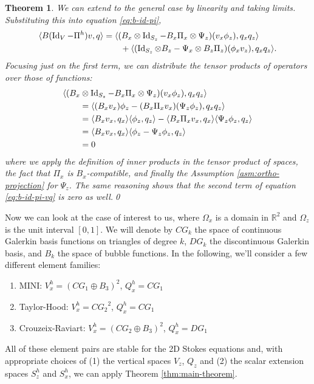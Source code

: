\documentclass{article}
\theoremstyle{definition}
\theoremstyle{plain}
\newtheorem{thm}{Theorem}
\newcommand{\Id}[1]{\operatorname{Id} #1}
\begin{document}
\begin{thm}
    We can extend to the general case by linearity and taking limits.
    Substituting this into equation \eqref{eq:b-id-pi},
    \begin{align}
        \langle B(\Id_V - \Pi^h)v, q\rangle & = \langle(B_x\otimes\Id_{S_z} - B_x\Pi_x\otimes \Psi_z)(v_x\phi_z), q_x q_z\rangle \nonumber \\
        & \qquad + \langle(\Id_{S_z}\otimes B_z - \Psi_x\otimes B_z\Pi_z)(\phi_xv_z), q_xq_z\rangle.
        \label{eq:b-id-pi-vq}
    \end{align}
    Focusing just on the first term, we can distribute the tensor products of operators over those of functions:
    \begin{align}
        & \langle(B_x\otimes\Id_{S_z} - B_x\Pi_x\otimes \Psi_z)(v_x\phi_z), q_x q_z\rangle \nonumber\\
        &\qquad = \langle (B_xv_x)\phi_z - (B_x\Pi_xv_x)(\Psi_z\phi_z), q_x q_z\rangle \nonumber\\
        &\qquad = \langle B_xv_x, q_x\rangle\langle\phi_z, q_z\rangle - \langle B_x\Pi_xv_x, q_x\rangle\langle \Psi_z\phi_z, q_z\rangle \\
        &\qquad = \langle B_xv_x, q_x\rangle\langle \phi_z - \Psi_z\phi_z, q_z\rangle \\
        &\qquad = 0
    \end{align}
    where we apply the definition of inner products in the tensor product of spaces, the fact that $\Pi_x$ is $B_x$-compatible, and finally the Assumption \ref{asm:ortho-projection} for $\Psi_z$.
    The same reasoning shows that the second term of equation \eqref{eq:b-id-pi-vq} is zero as well.\qed
\end{thm}

Now we can look at the case of interest to us, where $\Omega_x$ is a domain in $\mathbb{R}^2$ and $\Omega_z$ is the unit interval $[0, 1]$.
We will denote by $CG_k$ the space of continuous Galerkin basis functions on triangles of degree $k$, $DG_k$ the discontinuous Galerkin basis, and $B_k$ the space of bubble functions.
In the following, we'll consider a few different element families:
\begin{enumerate}
    \item MINI: $V_x^h = (CG_1 \oplus B_3)^2$, $Q_x^h = CG_1$
    \item Taylor-Hood: $V_x^h = {CG_2}^2$, $Q_x^h = CG_1$
    \item Crouzeix-Raviart: $V_x^h = (CG_2\oplus B_3)^2$, $Q_x^h = DG_1$
\end{enumerate}
All of these element pairs are stable for the 2D Stokes equations and, with appropriate choices of (1) the vertical spaces $V_z$, $Q_z$ and (2) the scalar extension spaces $S_z^h$ and $S_x^h$, we can apply Theorem \ref{thm:main-theorem}.
\end{document}
